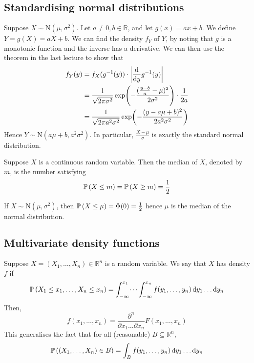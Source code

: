 \subsection{Standardising normal distributions}
Suppose \(X \sim \mathrm{N}(\mu, \sigma^2)\).
Let \(a \neq 0, b \in \mathbb R\), and let \(g(x) = ax+b\).
We define \(Y = g(X) = aX+b\).
We can find the density \(f_Y\) of \(Y\), by noting that \(g\) is a monotonic function and the inverse has a derivative.
We can then use the theorem in the last lecture to show that
\begin{align*}
	f_Y(y) & = f_X(g^{-1}(y)) \cdot \abs{\dv{y} g^{-1}(y)}                                                       \\
	       & = \frac{1}{\sqrt{2\pi\sigma^2}} \exp(-\frac{(\frac{y-b}{a} - \mu)^2}{2\sigma^2}) \cdot \frac{1}{2a} \\
	       & =\frac{1}{\sqrt{2\pi a^2\sigma^2}} \exp(-\frac{(y - a\mu + b)^2}{2 a^2 \sigma^2})
\end{align*}
Hence \(Y \sim \mathrm{N}(a \mu + b, a^2 \sigma^2)\).
In particular, \(\frac{X-\mu}{\sigma}\) is exactly the standard normal distribution.
\begin{definition}
	Suppose \(X\) is a continuous random variable.
	Then the median of \(X\), denoted by \(m\), is the number satisfying
	\[
		\mathbb{P}\left({X \leq m}\right) = \mathbb{P}\left({X \geq m}\right) = \frac{1}{2}
	\]
\end{definition}
If \(X \sim \mathrm{N}(\mu, \sigma^2)\), then \(\mathbb{P}\left({X \leq \mu}\right) = \Phi(0) = \frac{1}{2}\) hence \(\mu\) is the median of the normal distribution.

\subsection{Multivariate density functions}
Suppose \(X = (X_1, \dots, X_n) \in \mathbb R^n\) is a random variable.
We say that \(X\) has density \(f\) if
\[
	\mathbb{P}\left({X_1 \leq x_1, \dots, X_n \leq x_n}\right) = \int_{-\infty}^{x_1} \dots \int_{-\infty}^{x_n}  f(y_1, \dots, y_n) \dd{y_1} \dots \dd{y_n}
\]
Then,
\[
	f(x_1, \dots, x_n) = \frac{\partial^n}{\partial x_1 \dots \partial x_n} F(x_1, \dots, x_n)
\]
This generalises the fact that for all (reasonable) \(B \subseteq \mathbb R^n\),
\[
	\mathbb{P}\left({(X_1, \dots, X_n) \in B}\right) = \int_B f(y_1, \dots, y_n) \dd{y_1}\dots\dd{y_n}
\]

